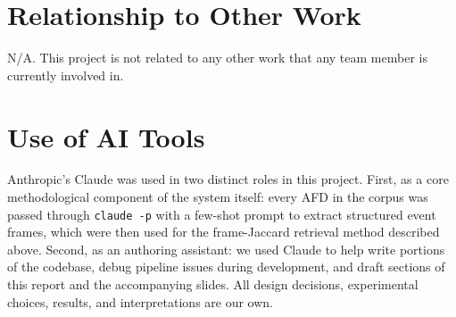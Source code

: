 \documentclass[11pt]{article}
\begin{document}
\section*{Relationship to Other Work}
N/A. This project is not related to any other work that any team member is currently involved in.

\section*{Use of AI Tools}
Anthropic's Claude was used in two distinct roles in this project. First, as a core methodological component of the system itself: every AFD in the corpus was passed through \texttt{claude -p} with a few-shot prompt to extract structured event frames, which were then used for the frame-Jaccard retrieval method described above. Second, as an authoring assistant: we used Claude to help write portions of the codebase, debug pipeline issues during development, and draft sections of this report and the accompanying slides. All design decisions, experimental choices, results, and interpretations are our own.
\end{document}
